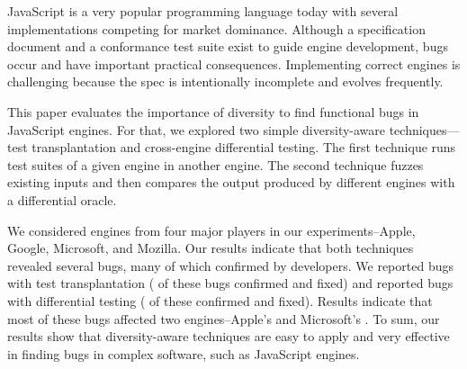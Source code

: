 JavaScript is a very popular programming language today with several
implementations competing for market dominance. Although a
specification document and a conformance test suite exist to guide
engine development, bugs occur and have important practical
consequences. Implementing correct
engines is challenging because the spec is intentionally
incomplete and evolves frequently.

This paper evaluates the importance of
diversity to find functional bugs in JavaScript engines. For that, we
explored two simple diversity-aware techniques---test transplantation and
cross-engine differential testing. The first technique runs test
suites of a given engine in another engine. The second technique
fuzzes existing inputs and then compares the output produced by
different engines with a differential oracle.

\sloppy
We considered engines from four major players in our
experiments--Apple, Google, Microsoft, and Mozilla. Our results
indicate that both techniques revealed several bugs, many of which
confirmed by developers. We reported \noBugsTransplantation{} bugs
with test transplantation (\noBugsTransplantationConfirmed{} of these bugs
confirmed and \noBugsTransplantationFixed{} fixed) and reported
\noBugsDifferentialTesting{} bugs with differential testing
(\noBugsDifferentialTestingConfirmed{} of these confirmed
and \noBugsDifferentialTestingFixed{} fixed). Results indicate that
most of these bugs affected two engines--Apple's
\jsc{} and Microsoft's \chakra{}. To sum, our results show that
diversity-aware techniques are easy to apply and very effective in
finding bugs in complex software, such as JavaScript engines.


